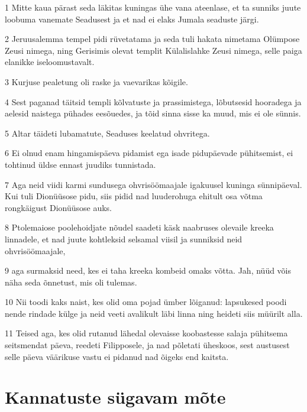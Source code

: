 \par 1 Mitte kaua pärast seda läkitas kuningas ühe vana ateenlase, et ta sunniks juute loobuma vanemate Seadusest ja et nad ei elaks Jumala seaduste järgi.
\par 2 Jeruusalemma tempel pidi rüvetatama ja seda tuli hakata nimetama Olümpose Zeusi nimega, ning Gerisimis olevat templit Külalislahke Zeusi nimega, selle paiga elanikke iseloomustavalt.
\par 3 Kurjuse pealetung oli raske ja vaevarikas kõigile.
\par 4 Sest paganad täitsid templi kõlvatuste ja prassimistega, lõbutsesid hooradega ja aelesid naistega pühades eesõuedes, ja tõid sinna sisse ka muud, mis ei ole sünnis.
\par 5 Altar täideti lubamatute, Seaduses keelatud ohvritega.
\par 6 Ei olnud enam hingamispäeva pidamist ega isade pidupäevade pühitsemist, ei tohtinud üldse ennast juudiks tunnistada.
\par 7 Aga neid viidi karmi sundusega ohvrisöömaajale igakuusel kuninga sünnipäeval. Kui tuli Dionüüsose pidu, siis pidid nad luuderohuga ehitult osa võtma rongkäigust Dionüüsose auks.
\par 8 Ptolemaiose poolehoidjate nõudel saadeti käsk naabruses olevaile kreeka linnadele, et nad juute kohtleksid selsamal viisil ja sunniksid neid ohvrisöömaajale,
\par 9 aga surmaksid need, kes ei taha kreeka kombeid omaks võtta. Jah, nüüd võis näha seda õnnetust, mis oli tulemas.
\par 10 Nii toodi kaks naist, kes olid oma pojad ümber lõiganud: lapsukesed poodi nende rindade külge ja neid veeti avalikult läbi linna ning heideti siis müürilt alla.
\par 11 Teised aga, kes olid rutanud lähedal olevaisse koobastesse salaja pühitsema seitsmendat päeva, reedeti Filipposele, ja nad põletati üheskoos, sest austusest selle päeva väärikuse vastu ei pidanud nad õigeks end kaitsta.


\section*{Kannatuste sügavam mõte}

